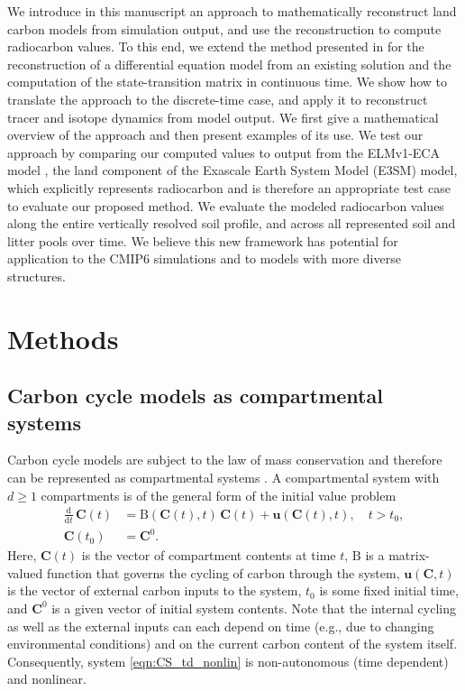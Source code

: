 \documentclass[draft]{agujournal2019}
\renewcommand{\vec}[1]{\mathbf{#1}}
\newcommand{\tens}[1]{\mathrm{#1}}
\newcommand{\deriv}[1]{\frac{\mathrm{d}}{\mathrm{d}#1}}
\begin{document}
We introduce in this manuscript an approach to mathematically reconstruct land carbon models from simulation output, and use the reconstruction to compute radiocarbon values. To this end, we extend the method presented in  for the reconstruction of a differential equation model from an existing solution and the computation of the state-transition matrix in continuous time. We show how to translate the approach to the discrete-time case, and apply it to reconstruct tracer and isotope dynamics from model output. We first give a mathematical overview of the approach and then present examples of its use. We test our approach by comparing our computed values to output from the ELMv1-ECA model \cite{Zhu2019, Riley2018,Chen2009JGR, Tang2018EI}, the land component of the Exascale Earth System Model (E3SM) model, which explicitly represents radiocarbon and is therefore an appropriate test case to evaluate our proposed method. We evaluate the modeled radiocarbon values along the entire vertically resolved soil profile, and across all represented soil and litter pools over time. We believe this new framework has  potential for application to the CMIP6 simulations and to models with more diverse structures.

\section{Methods}
\subsection{Carbon cycle models as compartmental systems}
Carbon cycle models are subject to the law of mass conservation and therefore can be represented as compartmental systems \cite{Anderson1983, Jacquez1993}. A compartmental system with $d\geq1$ compartments is of the general form of the initial value problem
    \begin{equation}\label{eqn:CS_td_nonlin}
        \begin{aligned}
            \deriv{t}\,\vec{C}(t) &= \tens{B}(\vec{C}(t),t)\,\vec{C}(t) + \vec{u}(\vec{C}(t),t),\quad t>t_0,\\
            \vec{C}(t_0) &= \vec{C}^0.
        \end{aligned}
    \end{equation}Here, $\vec{C}(t)$ is the vector of compartment contents at time $t$, $\tens{B}$ is a matrix-valued function that governs the cycling of carbon through the system, $\vec{u}(\vec{C},t)$ is the vector of external carbon inputs to the system, $t_0$ is some fixed initial time, and $\vec{C}^0$ is a given vector  of initial system contents. Note that the internal cycling as well as the external inputs can each depend on time (e.g., due to changing environmental conditions) and on the current carbon content of the system itself. Consequently, system \eqref{eqn:CS_td_nonlin} is non-autonomous (time dependent) and nonlinear.
\end{document}
